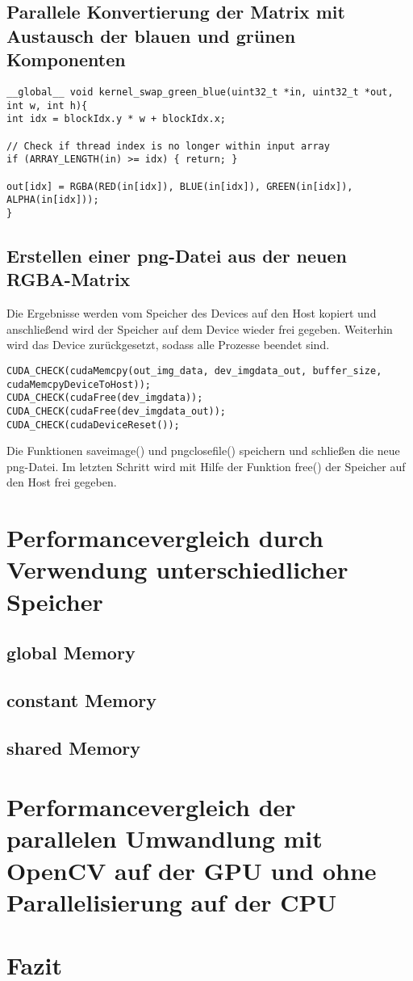 \documentclass{llncs}
\begin{document}
\subsection{Parallele Konvertierung der Matrix mit Austausch der blauen und grünen Komponenten}
%
\begin{lstlisting}
__global__ void kernel_swap_green_blue(uint32_t *in, uint32_t *out, int w, int h){
int idx = blockIdx.y * w + blockIdx.x;

// Check if thread index is no longer within input array
if (ARRAY_LENGTH(in) >= idx) { return; }

out[idx] = RGBA(RED(in[idx]), BLUE(in[idx]), GREEN(in[idx]), ALPHA(in[idx]));
}
\end{lstlisting}
%
\subsection{Erstellen einer png-Datei aus der neuen RGBA-Matrix}
%
Die Ergebnisse werden vom Speicher des Devices auf den Host kopiert und anschließend wird der Speicher auf dem Device wieder frei gegeben. Weiterhin wird das Device zurückgesetzt, sodass alle Prozesse beendet sind.\\
 
\begin{lstlisting}
CUDA_CHECK(cudaMemcpy(out_img_data, dev_imgdata_out, buffer_size, cudaMemcpyDeviceToHost));
CUDA_CHECK(cudaFree(dev_imgdata));
CUDA_CHECK(cudaFree(dev_imgdata_out));
CUDA_CHECK(cudaDeviceReset());
\end{lstlisting}

Die Funktionen save\textunderscore image() und png\textunderscore close\textunderscore file() speichern und schließen die neue png-Datei. Im letzten Schritt wird mit Hilfe der Funktion free() der Speicher auf den Host frei gegeben.\\

%
\section{Performancevergleich durch Verwendung unterschiedlicher Speicher}
%
\subsection{global Memory}
%

%
\subsection{constant Memory}
%

%
\subsection{shared Memory}
%

%
\section{Performancevergleich der parallelen Umwandlung mit OpenCV auf der GPU und ohne Parallelisierung auf der CPU}
%

%
\section{Fazit}
%

%
\newpage
%



%
\end{document}
